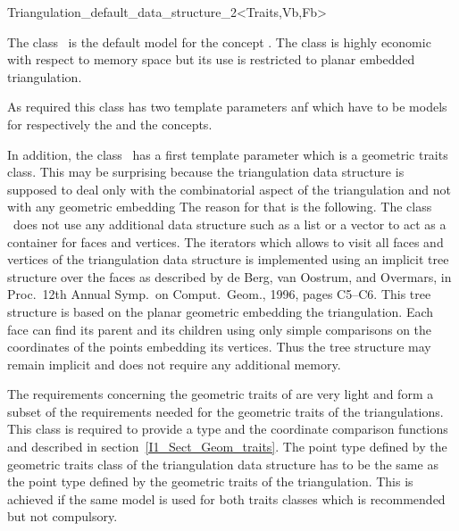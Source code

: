 

\begin{ccRefClass}{Triangulation_default_data_structure_2<Traits,Vb,Fb>} 

\ccDefinition
  
The class \ccRefName\ is the default model for the concept
.
The class \ccRefName 
is highly economic with respect to memory space but its use is
restricted
to planar embedded triangulation.

As required this class has two template parameters  anf 
which have 
to be models for respectively the
 and 
the  concepts.

In addition, the class \ccClassTemplateName\ has a first template parameter
which is a geometric traits class. This may be surprising because
the triangulation data structure is supposed to deal only with the combinatorial
aspect of the triangulation and not with any geometric embedding
The reason for that is the following.
The class \ccRefName\ does not use any additional data structure
such as a list or a vector to act as a container for faces and vertices.
The iterators which allows to visit all faces and vertices of the
triangulation
data structure
is implemented using  an implicit tree structure over the faces
as described by
 de Berg, van Oostrum, and Overmars, 
in Proc.\ 12th Annual Symp.\ on Comput.\ Geom.,
1996, pages C5--C6. This tree structure is  based on the planar
geometric embedding
the triangulation. Each face 
 can find its parent 
and its children using only simple comparisons on the
coordinates of the points embedding its vertices.
Thus the tree structure may remain implicit 
and does not require any additional memory. 

The requirements concerning the geometric traits  of
 are very light and form a subset of the requirements needed
for the geometric traits of the triangulations. 
This class is required  to provide a type 
and the coordinate comparison functions  and
described in section~\ref{I1_Sect_Geom_traits}. The point type
defined by the geometric traits class of the triangulation data structure
has to be the same 
as the point type defined by the geometric traits of the triangulation.
This is achieved if the same model is used for both traits classes
which is recommended but not compulsory.



\end{ccRefClass}
